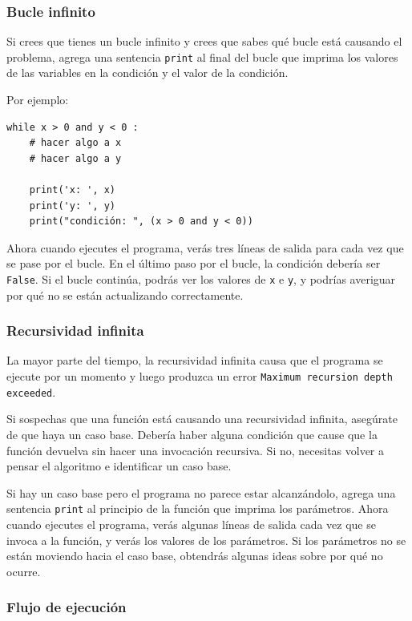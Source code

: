 \documentclass[10pt]{book}
\begin{document}
\subsubsection{Bucle infinito}

Si crees que tienes un bucle infinito y crees que sabes
qué bucle está causando el problema, agrega una sentencia {\tt print}
al final del bucle que imprima los valores de las variables en
la condición y el valor de la condición.

Por ejemplo:

\begin{verbatim}
while x > 0 and y < 0 :
    # hacer algo a x
    # hacer algo a y 

    print('x: ', x)
    print('y: ', y)
    print("condición: ", (x > 0 and y < 0))
\end{verbatim}
%
Ahora cuando ejecutes el programa, verás tres líneas de salida
para cada vez que se pase por el bucle.  En el último paso por el
bucle, la condición debería ser {\tt False}.  Si el bucle
continúa, podrás ver los valores de {\tt x} e {\tt y},
y podrías averiguar por qué no se están actualizando correctamente.


\subsubsection{Recursividad infinita}

La mayor parte del tiempo, la recursividad infinita causa que el programa se
ejecute por un momento y luego produzca un error
{\tt Maximum recursion depth exceeded}.

Si sospechas que una función está causando una recursividad
infinita, asegúrate de que haya un caso base.
Debería haber alguna condición que cause que la
función devuelva sin hacer una invocación recursiva.
Si no, necesitas volver a pensar el algoritmo e identificar un caso
base.

Si hay un caso base pero el programa no parece estar alcanzándolo,
agrega una sentencia {\tt print} al principio de la función
que imprima los parámetros.  Ahora cuando ejecutes el programa, verás
algunas líneas de salida cada vez que se invoca a la función,
y verás los valores de los parámetros.  Si los parámetros no se están moviendo
hacia el caso base, obtendrás algunas ideas sobre por qué no ocurre.


\subsubsection{Flujo de ejecución}
\end{document}
